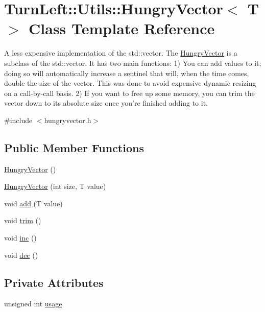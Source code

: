 \hypertarget{classTurnLeft_1_1Utils_1_1HungryVector}{
\section{TurnLeft::Utils::HungryVector$<$ T $>$ Class Template Reference}
\label{classTurnLeft_1_1Utils_1_1HungryVector}
}


A less expensive implementation of the std::vector. The \hyperlink{classTurnLeft_1_1Utils_1_1HungryVector}{HungryVector} is a subclass of the std::vector. It has two main functions: 1) You can add values to it; doing so will automatically increase a sentinel that will, when the time comes, double the size of the vector. This was done to avoid expensive dynamic resizing on a call-\/by-\/call basis. 2) If you want to free up some memory, you can trim the vector down to its absolute size once you're finished adding to it.  




{\ttfamily \#include $<$hungryvector.h$>$}

\subsection*{Public Member Functions}
\begin{DoxyCompactItemize}
\item 
\hyperlink{classTurnLeft_1_1Utils_1_1HungryVector_a3f92da70d31c708265ea772783e5453a}{HungryVector} ()
\item 
\hyperlink{classTurnLeft_1_1Utils_1_1HungryVector_a94809b454b9ceea51f4e3c332e5db7ae}{HungryVector} (int size, T value)
\item 
void \hyperlink{classTurnLeft_1_1Utils_1_1HungryVector_a9eeefa75b26da7317c0e22929e729464}{add} (T value)
\item 
void \hyperlink{classTurnLeft_1_1Utils_1_1HungryVector_a1f47546497d946f2c5a988f242e4863f}{trim} ()
\item 
void \hyperlink{classTurnLeft_1_1Utils_1_1HungryVector_ade6e0a3c8b5524e487a0c724606d130d}{inc} ()
\item 
void \hyperlink{classTurnLeft_1_1Utils_1_1HungryVector_adf7287a513b121b56f543c6826a4216e}{dec} ()
\end{DoxyCompactItemize}
\subsection*{Private Attributes}
\begin{DoxyCompactItemize}
\item 
unsigned int \hyperlink{classTurnLeft_1_1Utils_1_1HungryVector_a1b1c6ed260138ef704637a7a7ecedf26}{usage}
\end{DoxyCompactItemize}


